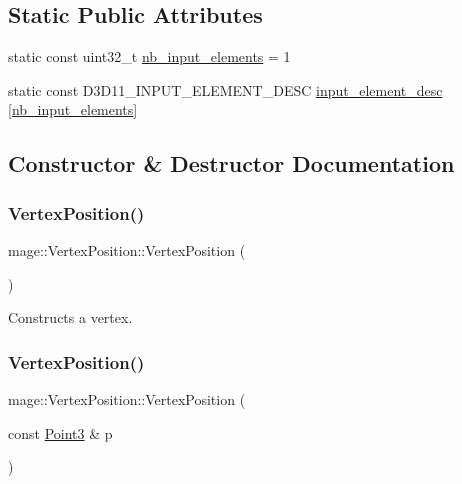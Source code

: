 \subsection*{Static Public Attributes}
\begin{DoxyCompactItemize}
\item 
static const uint32\+\_\+t \hyperlink{structmage_1_1_vertex_position_a788286b735c09aa85d855c2773d1a504}{nb\+\_\+input\+\_\+elements} = 1
\item 
static const D3\+D11\+\_\+\+I\+N\+P\+U\+T\+\_\+\+E\+L\+E\+M\+E\+N\+T\+\_\+\+D\+E\+SC \hyperlink{structmage_1_1_vertex_position_a1128c6529b1c1d7c4482e48deba46548}{input\+\_\+element\+\_\+desc} \mbox{[}\hyperlink{structmage_1_1_vertex_position_a788286b735c09aa85d855c2773d1a504}{nb\+\_\+input\+\_\+elements}\mbox{]}
\end{DoxyCompactItemize}


\subsection{Constructor \& Destructor Documentation}
\hypertarget{structmage_1_1_vertex_position_a2e6037836e67cdf5c43fc9abfa0d3753}{}\label{structmage_1_1_vertex_position_a2e6037836e67cdf5c43fc9abfa0d3753} 
\subsubsection{\texorpdfstring{Vertex\+Position()}{VertexPosition()}\hspace{0.1cm}{\footnotesize\ttfamily [1/4]}}
{\footnotesize\ttfamily mage\+::\+Vertex\+Position\+::\+Vertex\+Position (\begin{DoxyParamCaption}{ }\end{DoxyParamCaption})\hspace{0.3cm}{\ttfamily [default]}}

Constructs a vertex. \hypertarget{structmage_1_1_vertex_position_aca7867e7a2d0cb50f32283dd91bb2aed}{}\label{structmage_1_1_vertex_position_aca7867e7a2d0cb50f32283dd91bb2aed} 
\subsubsection{\texorpdfstring{Vertex\+Position()}{VertexPosition()}\hspace{0.1cm}{\footnotesize\ttfamily [2/4]}}
{\footnotesize\ttfamily mage\+::\+Vertex\+Position\+::\+Vertex\+Position (\begin{DoxyParamCaption}\item[{const \hyperlink{structmage_1_1_point3}{Point3} \&}]{p }\end{DoxyParamCaption})}

